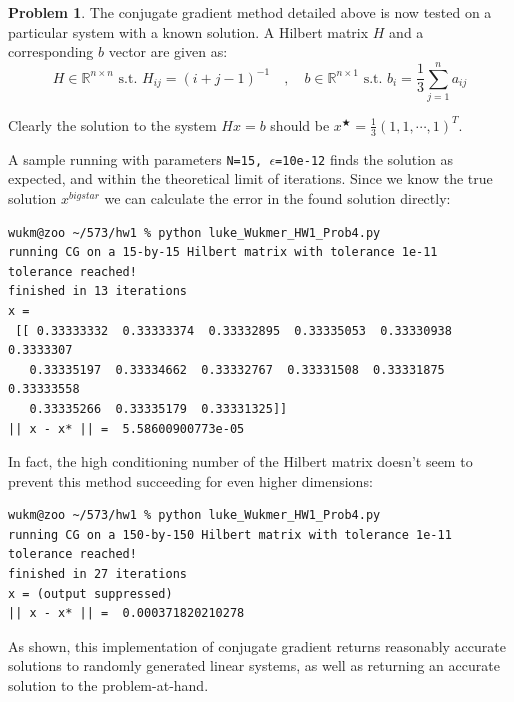 \documentclass[10pt]{article}
\theoremstyle{plain}
\theoremstyle{definition}
\newtheorem{prob}{Problem}
\providecommand{\R}{\mathbb{R}}%
\numberwithin{equation}{section}
\providecommand{\st}{\text{ s.t. }}
\begin{document}
\begin{prob}
The conjugate gradient method detailed above is now tested on a particular system with a known solution. A Hilbert matrix $H$ and a corresponding $b$ vector are given as:
\[
        H \in \R^{n\times n} \st H_{ij} = \left(i + j - 1\right)^{-1} \quad , \quad
        b \in \R^{n\times 1} \st b_i = \frac{1}{3} \sum_{j=1}^n a_{ij}
    \]

    Clearly the solution to the system $Hx=b$ should be $x^{\bigstar} = \frac{1}{3}(1, 1, \cdots, 1)^T$.

A sample running with parameters \texttt{N=15, $\epsilon$=10e-12} finds the
solution as expected, and within the theoretical limit of iterations. Since we
know the true solution $x^{bigstar}$ we can calculate the error in the found solution
directly:

\begin{verbatim}
wukm@zoo ~/573/hw1 % python luke_Wukmer_HW1_Prob4.py
running CG on a 15-by-15 Hilbert matrix with tolerance 1e-11
tolerance reached!
finished in 13 iterations
x =
 [[ 0.33333332  0.33333374  0.33332895  0.33335053  0.33330938  0.3333307
   0.33335197  0.33334662  0.33332767  0.33331508  0.33331875  0.33333558
   0.33335266  0.33335179  0.33331325]]
|| x - x* || =  5.58600900773e-05
\end{verbatim}

In fact, the high conditioning number of the Hilbert matrix doesn't seem to prevent this method succeeding for even higher dimensions:

\begin{verbatim}
wukm@zoo ~/573/hw1 % python luke_Wukmer_HW1_Prob4.py
running CG on a 150-by-150 Hilbert matrix with tolerance 1e-11
tolerance reached!
finished in 27 iterations
x = (output suppressed)
|| x - x* || =  0.000371820210278
\end{verbatim}

As shown, this implementation of conjugate gradient returns reasonably accurate
solutions to randomly generated linear systems, as well as returning an accurate solution
to the problem-at-hand.
\end{prob}
\hrulefill
\end{document}
